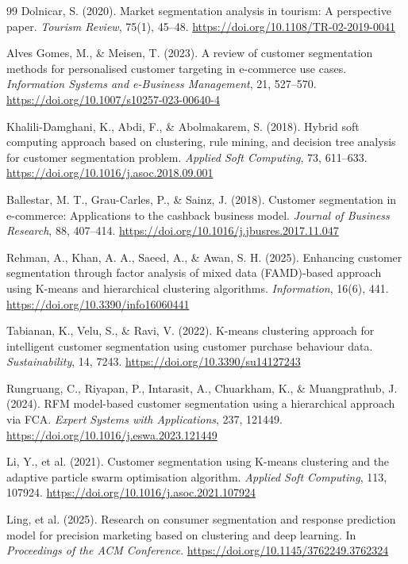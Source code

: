 \documentclass[10pt]{article}
\begin{document}
\begin{thebibliography}{99}
Dolnicar, S. (2020).
Market segmentation analysis in tourism: A perspective paper.
\textit{Tourism Review}, 75(1), 45--48.
\url{https://doi.org/10.1108/TR-02-2019-0041}

Alves Gomes, M., \& Meisen, T. (2023).
A review of customer segmentation methods for personalised customer targeting in e-commerce use cases.
\textit{Information Systems and e-Business Management}, 21, 527--570.
\url{https://doi.org/10.1007/s10257-023-00640-4}

Khalili-Damghani, K., Abdi, F., \& Abolmakarem, S. (2018).
Hybrid soft computing approach based on clustering, rule mining, and decision tree analysis for customer segmentation problem.
\textit{Applied Soft Computing}, 73, 611--633.
\url{https://doi.org/10.1016/j.asoc.2018.09.001}

Ballestar, M. T., Grau-Carles, P., \& Sainz, J. (2018).
Customer segmentation in e-commerce: Applications to the cashback business model.
\textit{Journal of Business Research}, 88, 407--414.
\url{https://doi.org/10.1016/j.jbusres.2017.11.047}

Rehman, A., Khan, A. A., Saeed, A., \& Awan, S. H. (2025).
Enhancing customer segmentation through factor analysis of mixed data (FAMD)-based approach using K-means and hierarchical clustering algorithms.
\textit{Information}, 16(6), 441.
\url{https://doi.org/10.3390/info16060441}

Tabianan, K., Velu, S., \& Ravi, V. (2022).
K-means clustering approach for intelligent customer segmentation using customer purchase behaviour data.
\textit{Sustainability}, 14, 7243.
\url{https://doi.org/10.3390/su14127243}

Rungruang, C., Riyapan, P., Intarasit, A., Chuarkham, K., \& Muangprathub, J. (2024).
RFM model-based customer segmentation using a hierarchical approach via FCA.
\textit{Expert Systems with Applications}, 237, 121449.
\url{https://doi.org/10.1016/j.eswa.2023.121449}

Li, Y., et al. (2021).
Customer segmentation using K-means clustering and the adaptive particle swarm optimisation algorithm.
\textit{Applied Soft Computing}, 113, 107924.
\url{https://doi.org/10.1016/j.asoc.2021.107924}

Ling, et al. (2025).
Research on consumer segmentation and response prediction model for precision marketing based on clustering and deep learning.
In \textit{Proceedings of the ACM Conference}.
\url{https://doi.org/10.1145/3762249.3762324}


\end{thebibliography}
\end{document}
